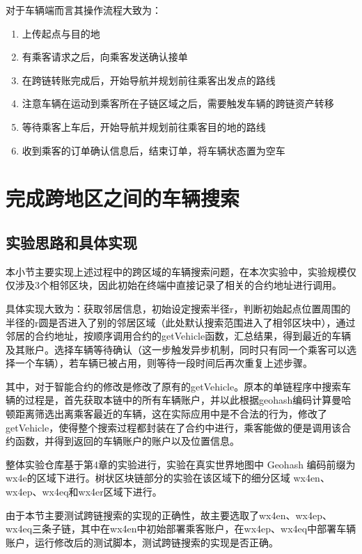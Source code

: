 对于车辆端而言其操作流程大致为：

\begin{enumerate}
    \item 上传起点与目的地
    \item 有乘客请求之后，向乘客发送确认接单
    \item 在跨链转账完成后，开始导航并规划前往乘客出发点的路线
    \item 注意车辆在运动到乘客所在子链区域之后，需要触发车辆的跨链资产转移
    \item 等待乘客上车后，开始导航并规划前往乘客目的地的路线
    \item 收到乘客的订单确认信息后，结束订单，将车辆状态置为空车
\end{enumerate}


\section{完成跨地区之间的车辆搜索}

\subsection{实验思路和具体实现}

本小节主要实现上述过程中的跨区域的车辆搜索问题，在本次实验中，实验规模仅仅涉及3个相邻区块，因此初始在终端中直接记录了相关的合约地址进行调用。

具体实现大致为：获取邻居信息，初始设定搜索半径r，判断初始起点位置周围的半径的r圆是否进入了别的邻居区域（此处默认搜索范围进入了相邻区块中），通过邻居的合约地址，按顺序调用合约的getVehicle函数，汇总结果，得到最近的车辆及其账户。选择车辆等待确认（这一步触发异步机制，同时只有同一个乘客可以选择一个车辆），若车辆已被占用，则等待一段时间后再次重复上述步骤。

其中，对于智能合约的修改是修改了原有的getVehicle。原本的单链程序中搜索车辆的过程是，首先获取本链中的所有车辆账户，并以此根据geohash编码计算曼哈顿距离筛选出离乘客最近的车辆，这在实际应用中是不合法的行为，修改了getVehicle，使得整个搜索过程都封装在了合约中进行，乘客能做的便是调用该合约函数，并得到返回的车辆账户的账户以及位置信息。

整体实验仓库基于第4章的实验进行，实验在真实世界地图中 Geohash 编码前缀为wx4e的区域下进行。树状区块链部分的实验在该区域下的细分区域 wx4en、wx4ep、wx4eq和wx4er区域下进行。

由于本节主要测试跨链搜索的实现的正确性，故主要选取了wx4en、wx4ep、wx4eq三条子链，其中在wx4en中初始部署乘客账户，在wx4ep、wx4eq中部署车辆账户，运行修改后的测试脚本，测试跨链搜索的实现是否正确。

